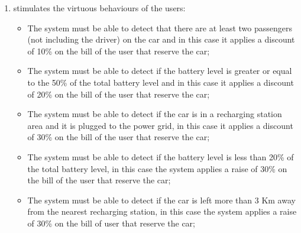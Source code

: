 \begin{enumerate}
\item stimulates the virtuous behaviours of the users:

\begin{itemize}
	\item The system must be able to detect that there are at least two passengers (not including the driver) on the car and in this case it applies a discount of 10\% on the bill of the user that reserve the car;
	\item The system must be able to detect if  the battery level is greater or equal to the 50\% of the total battery level and in this case it applies a discount of 20\% on the bill of the user that reserve the car;
	\item The system must be able to detect if the car is in a recharging station area and it is plugged to the power grid, in this case it applies a discount of 30\% on the bill of the user that reserve the car;
	\item The system must be able to detect if the battery level is less than 20\% of the total battery level, in this case the system applies a raise of 30\% on the bill of the user that reserve the car;
	\item The system must be able to detect if the car is left more than 3 Km away from the nearest recharging station, in this case the system applies a raise of 30\% on the bill of user that reserve the car;
\end{itemize}

\end{enumerate}